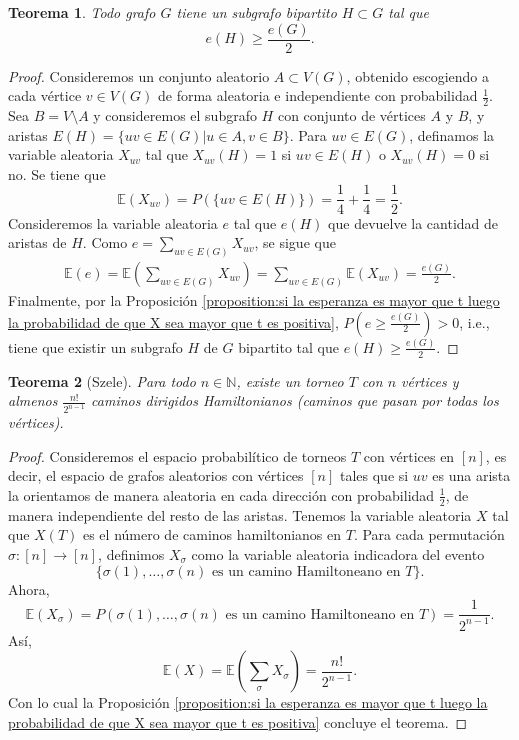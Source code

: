 \documentclass[12pt]{report}
\theoremstyle{plain}
\newtheorem{theorem}{Teorema}[section]
\theoremstyle{definition}
\newcommand{\naturals}{\mathbb{N}}
\begin{document}
\begin{theorem}
Todo grafo $G$ tiene un subgrafo bipartito $H \subset G$ tal que
\[
    e(H) \geq \frac{e(G)}{2}.
\]
\end{theorem}
\begin{proof}
Consideremos un conjunto aleatorio $A \subset V(G)$, obtenido escogiendo a cada vértice $v \in V(G)$ de forma aleatoria e independiente con probabilidad $\frac 1 2$. Sea $B = V \setminus A$ y consideremos el subgrafo $H$ con conjunto de vértices $A$ y $B$, y aristas $E(H) = \{uv \in E(G) | u \in A, v \in B\}$. Para $uv \in E(G)$, definamos la variable aleatoria $X_{uv}$ tal que $X_{uv} (H) = 1$ si $uv \in E(H)$ o $X_{uv} (H) = 0$ si no. Se tiene que
\[
    \mathbb{E} (X_{uv}) = P (\{uv \in E(H)\}) = \frac 1 4 + \frac 1 4 = \frac 1 2.
\]
Consideremos la variable aleatoria $e$ tal que $e(H)$ que devuelve la cantidad de aristas de $H$. Como $e = \sum_{uv \in E(G)} X_{uv}$, se sigue que
\begin{align*}
\mathbb{E} (e) = \mathbb{E} \left ( \sum_{uv \in E(G)} X_{uv} \right ) = \sum_{uv \in E(G)} \mathbb{E}(X_{uv}) = \frac{e(G)}{2}.
\end{align*}
Finalmente, por la Proposición \ref{proposition:si la esperanza es mayor que t luego la probabilidad de que X sea mayor que t es positiva}, $P(e \geq \frac{e(G)}{2}) > 0$, i.e., tiene que existir un subgrafo $H$ de $G$ bipartito tal que $e(H) \geq \frac {e(G)}{2}$.
\end{proof}

\begin{theorem}[Szele]
Para todo $n \in \naturals$, existe un torneo $T$ con $n$ vértices y almenos $\frac{n!}{2^{n-1}}$ caminos dirigidos Hamiltonianos (caminos que pasan por todas los vértices).
\end{theorem}
\begin{proof}
Consideremos el espacio probabilítico de torneos $T$ con vértices en $[n]$, es decir, el espacio de grafos aleatorios con vértices $[n]$ tales que si $uv$ es una arista la orientamos de manera aleatoria en cada dirección con probabilidad $\frac 1 2$, de manera independiente del resto de las aristas. Tenemos la variable aleatoria $X$ tal que $X(T)$ es el número de caminos hamiltonianos en $T$. Para cada permutación $\sigma : [n] \to [n]$, definimos $X_\sigma$ como la variable aleatoria indicadora del evento
\[
    \{\sigma (1), \ldots,  \sigma (n) \text{ es un camino Hamiltoneano en $T$}\}.
\]
Ahora,
\[
    \mathbb{E} (X_\sigma) = P (\sigma (1), \ldots, \sigma (n) \text{ es un camino Hamiltoneano en $T$}) = \frac 1 {2^{n-1}}.
\]
Así,
\[
\mathbb{E} (X) = \mathbb{E} \left(\sum_{\sigma} X_\sigma \right) = \frac{n!}{2^{n-1}}.
\]
Con lo cual la Proposición \ref{proposition:si la esperanza es mayor que t luego la probabilidad de que X sea mayor que t es positiva} concluye el teorema.
\end{proof}
\end{document}
